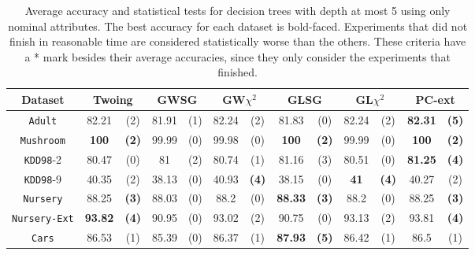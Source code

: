 \begin{table*}[t]
\tiny 
\centering
\caption{Average accuracy and statistical tests  for  decision trees 
with depth at most 5 using only nominal attributes. The best accuracy for each dataset is bold-faced. Experiments that did not finish in reasonable time are considered statistically worse than the others. These criteria have a * mark besides their average accuracies, since they only consider the experiments that finished.}
\begin{tabular}{c|cc|cc|cc|cc|cc|cc} 
Dataset & \multicolumn{2}{c|}{Twoing} &  \multicolumn{2}{c|}{GWSG}  
&   \multicolumn{2}{c|}{GW$\chi^2$}                   &\multicolumn{2}{c|}{GLSG}       &\multicolumn{2}{c|}{GL$\chi^2$} & \multicolumn{2}{c}{PC-ext}\\  \hline 
{\tt Adult}         & 82.21    & (2)    & 81.91    & (1)    & 82.24    & (2)    & 81.83    & (0)    & 82.24    & (2)    &{\bf82.31}&{\bf(5)}\\
{\tt Mushroom}      & {\bf 100}&{\bf(2)}& 99.99    & (0)    & 99.98    & (0)    &{\bf  100}&{\bf(2)}& 99.99    & (0)    &{\bf 100} &{\bf(2)}\\
{\tt KDD98}-2       & 80.47    & (0)    & 81       & (2)    & 80.74    & (1)    & 81.16    & (3)    & 80.51    & (0)    &{\bf81.25}&{\bf(4)}\\
{\tt KDD98}-9       & 40.35    & (2)    & 38.13    & (0)    & 40.93    &{\bf(4)}& 38.15    & (0)    &{\bf 41 } &{\bf(4)}& 40.27    & (2)    \\
{\tt Nursery}       & 88.25    &{\bf(3)}& 88.03    & (0)    & 88.2     & (0)    &{\bf88.33}&{\bf(3)}& 88.2     & (0)    & 88.25    &{\bf(3)}\\
{\tt Nursery-Ext}   &{\bf93.82}&{\bf(4)}& 90.95    & (0)    & 93.02    & (2)    & 90.75    & (0)    & 93.13    & (2)    & 93.81    &{\bf(4)}\\
{\tt Cars}          & 86.53    & (1)    & 85.39    & (0)    & 86.37    & (1)    &{\bf87.93}&{\bf(5)}& 86.42    & (1)    & 86.5     & (1)    \\

\end{tabular}
\end{table*}
